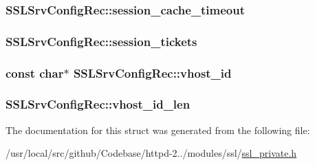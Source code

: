 \subsubsection[{\texorpdfstring{session\+\_\+cache\+\_\+timeout}{session_cache_timeout}}]{ S\+S\+L\+Srv\+Config\+Rec\+::session\+\_\+cache\+\_\+timeout}\hypertarget{structSSLSrvConfigRec_ad2ddc7bf93ec43915b0c05d28a9ff6b7}{}\label{structSSLSrvConfigRec_ad2ddc7bf93ec43915b0c05d28a9ff6b7}
\subsubsection[{\texorpdfstring{session\+\_\+tickets}{session_tickets}}]{ S\+S\+L\+Srv\+Config\+Rec\+::session\+\_\+tickets}\hypertarget{structSSLSrvConfigRec_aa96ee7eec878ff038db385257049b1b7}{}\label{structSSLSrvConfigRec_aa96ee7eec878ff038db385257049b1b7}
\subsubsection[{\texorpdfstring{vhost\+\_\+id}{vhost_id}}]{\setlength{\rightskip}{0pt plus 5cm}const char$\ast$ S\+S\+L\+Srv\+Config\+Rec\+::vhost\+\_\+id}\hypertarget{structSSLSrvConfigRec_a0517c50274f512bac682d23e0143f46d}{}\label{structSSLSrvConfigRec_a0517c50274f512bac682d23e0143f46d}
\subsubsection[{\texorpdfstring{vhost\+\_\+id\+\_\+len}{vhost_id_len}}]{ S\+S\+L\+Srv\+Config\+Rec\+::vhost\+\_\+id\+\_\+len}\hypertarget{structSSLSrvConfigRec_a50c4b7a1d9ffe1ffcfd03f6600103161}{}\label{structSSLSrvConfigRec_a50c4b7a1d9ffe1ffcfd03f6600103161}


The documentation for this struct was generated from the following file\+:\begin{DoxyCompactItemize}
\item 
/usr/local/src/github/\+Codebase/httpd-\/2../modules/ssl/\hyperlink{ssl__private_8h}{ssl\+\_\+private.\+h}\end{DoxyCompactItemize}
